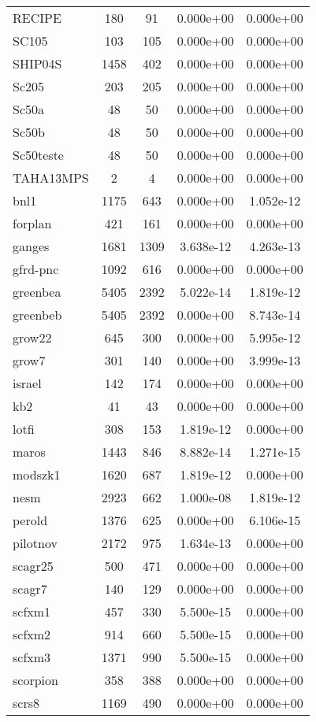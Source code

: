 \documentclass[12pt]{article}
\begin{document}
\begin{longtable}{@{}l|cccc@{}}
RECIPE & 180 & 91 & 0.000e+00 & 0.000e+00 \\
SC105 & 103 & 105 & 0.000e+00 & 0.000e+00 \\
SHIP04S & 1458 & 402 & 0.000e+00 & 0.000e+00 \\
Sc205 & 203 & 205 & 0.000e+00 & 0.000e+00 \\
Sc50a & 48 & 50 & 0.000e+00 & 0.000e+00 \\
Sc50b & 48 & 50 & 0.000e+00 & 0.000e+00 \\
Sc50teste & 48 & 50 & 0.000e+00 & 0.000e+00 \\
TAHA13MPS & 2 & 4 & 0.000e+00 & 0.000e+00 \\
bnl1 & 1175 & 643 & 0.000e+00 & 1.052e-12 \\
forplan & 421 & 161 & 0.000e+00 & 0.000e+00 \\
ganges & 1681 & 1309 & 3.638e-12 & 4.263e-13 \\
gfrd-pnc & 1092 & 616 & 0.000e+00 & 0.000e+00 \\
greenbea & 5405 & 2392 & 5.022e-14 & 1.819e-12 \\
greenbeb & 5405 & 2392 & 0.000e+00 & 8.743e-14 \\
grow22 & 645 & 300 & 0.000e+00 & 5.995e-12 \\
grow7 & 301 & 140 & 0.000e+00 & 3.999e-13 \\
israel & 142 & 174 & 0.000e+00 & 0.000e+00 \\
kb2 & 41 & 43 & 0.000e+00 & 0.000e+00 \\
lotfi & 308 & 153 & 1.819e-12 & 0.000e+00 \\
maros & 1443 & 846 & 8.882e-14 & 1.271e-15 \\
modszk1 & 1620 & 687 & 1.819e-12 & 0.000e+00 \\
nesm & 2923 & 662 & 1.000e-08 & 1.819e-12 \\
perold & 1376 & 625 & 0.000e+00 & 6.106e-15 \\
pilotnov & 2172 & 975 & 1.634e-13 & 0.000e+00 \\
scagr25 & 500 & 471 & 0.000e+00 & 0.000e+00 \\
scagr7 & 140 & 129 & 0.000e+00 & 0.000e+00 \\
scfxm1 & 457 & 330 & 5.500e-15 & 0.000e+00 \\
scfxm2 & 914 & 660 & 5.500e-15 & 0.000e+00 \\
scfxm3 & 1371 & 990 & 5.500e-15 & 0.000e+00 \\
scorpion & 358 & 388 & 0.000e+00 & 0.000e+00 \\
scrs8 & 1169 & 490 & 0.000e+00 & 0.000e+00 \\

\end{longtable}
\end{document}
